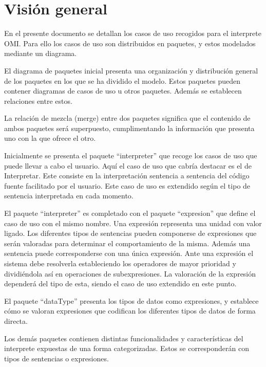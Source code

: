 \section{Visión general}
En el presente documento se detallan los casos de uso recogidos para el 
interprete OMI. Para ello los casos de uso son distribuidos
en paquetes, y estos modelados mediante un diagrama. 

El diagrama de paquetes inicial presenta una organización y distribución 
general de los paquetes en los que se ha dividido el modelo. Estos paquetes
pueden contener diagramas de casos de uso u otros paquetes. Además se establecen
relaciones entre estos.

La relación de mezcla (merge) entre dos paquetes significa que el contenido
de ambos paquetes será superpuesto, cumplimentando la información que presenta uno
con la que ofrece el otro. 

Inicialmente se presenta el paquete ``interpreter'' que recoge los casos 
de uso que puede llevar a cabo el usuario. Aquí el caso de uso que cabría 
destacar es el de Interpretar. Este consiste en la interpretación sentencia 
a sentencia del código fuente facilitado por el usuario. Este caso de
uso es extendido según el tipo de sentencia interpretada en cada momento.

El paquete ``interpreter'' es completado con el paquete ``expresion'' que
define el caso de uso con el mismo nombre. Una expresión representa una unidad con 
valor ligado. Los diferentes tipos de sentencias pueden componerse de expresiones 
que serán valoradas para determinar el comportamiento de la misma. Además una sentencia
puede corresponderse con una única expresión. Ante una expresión el sistema debe
resolverla estableciendo los operadores de mayor prioridad y dividiéndola 
así en operaciones de subexpresiones. La valoración de la expresión dependerá 
del tipo de esta, siendo el caso de uso extendido en este punto.

El paquete ``dataType'' presenta los tipos de datos como expresiones, y establece 
cómo se valoran expresiones que codifican los diferentes tipos de datos de forma
directa.

Los demás paquetes contienen distintas funcionalidades y características del
interprete expuestas de una forma categorizadas. Estos 
se corresponderán con tipos de sentencias o expresiones.

